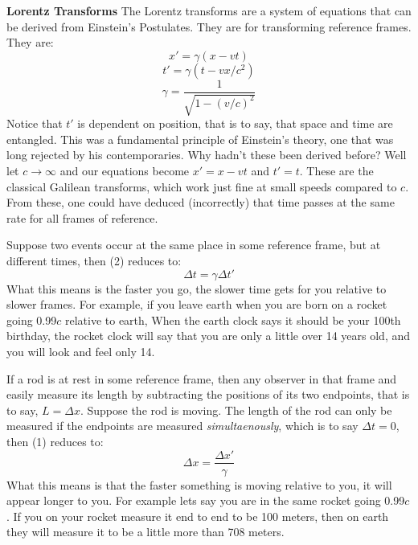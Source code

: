 \documentclass[conference]{IEEEtran}
\begin{document}
\textbf{Lorentz Transforms} The Lorentz transforms are a system of equations that can be derived from Einstein's Postulates. They are for transforming reference frames. They are:
\begin{equation}
x' = \gamma(x - vt)
\end{equation}
\begin{equation} 
t' = \gamma(t - vx/c^2)
\end{equation}
\begin{equation}
\gamma = \frac{1}{\sqrt{1 - (v/c)^2}}
\end{equation}
Notice that $t'$ is dependent on position, that is to say, that space and time are entangled. This was a fundamental principle of Einstein's theory, one that was long rejected by his contemporaries. Why hadn't these been derived before? Well let $c \rightarrow \infty$ and our equations become $x' = x - vt$ and $t' = t$. These are the classical Galilean transforms, which work just fine at small speeds compared to $c$. From these, one could have deduced (incorrectly) that time passes at the same rate for all frames of reference. 

Suppose two events occur at the same place in some reference frame, but at different times, then (2) reduces to:
\begin{equation}
\Delta t = \gamma \Delta t'
\end{equation}
What this means is the faster you go, the slower time gets for you relative to slower frames. For example, if you leave earth when you are born on a rocket going 0.99$c$ relative to earth, When the earth clock says it should be your 100th birthday, the rocket clock will say that you are only a little over 14 years old, and you will look and feel only 14. 

If a rod is at rest in some reference frame, then any observer in that frame and easily measure its length by subtracting the positions of its two endpoints, that is to say, $L = \Delta x$. Suppose the rod is moving. The length of the rod can only be measured if the endpoints are measured \textit{simultaenously}, which is to say $\Delta t = 0$, then (1) reduces to: 
\begin{equation}
\Delta x = \frac{\Delta x'}{\gamma}
\end{equation}
What this means is that the faster something is moving relative to you, it will appear longer to you. For example lets say you are in the same rocket going 0.99$c$. If you on your rocket measure it end to end to be 100 meters, then on earth they will measure it to be a little more than 708 meters.
\end{document}
